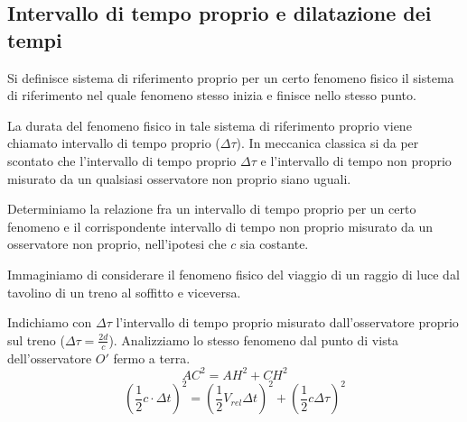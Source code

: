     \subsection{Intervallo di tempo proprio e dilatazione dei tempi}
        \par Si definisce sistema di riferimento proprio per un certo fenomeno fisico il sistema di riferimento nel quale fenomeno stesso inizia e finisce nello stesso punto.
        \par La durata del fenomeno fisico in tale sistema di riferimento proprio viene chiamato intervallo di tempo proprio ($\Delta\tau$). In meccanica classica si da per scontato che l'intervallo di tempo proprio $\Delta\tau$ e l'intervallo di tempo non proprio misurato da un qualsiasi osservatore non proprio siano uguali.
        \par Determiniamo la relazione fra un intervallo di tempo proprio per un certo fenomeno e il corrispondente intervallo di tempo non proprio misurato da un osservatore non proprio, nell'ipotesi che $c$ sia costante.
        \par Immaginiamo di considerare il fenomeno fisico del viaggio di un raggio di luce dal tavolino di un treno al soffitto e viceversa.
        \par Indichiamo con $\Delta\tau$ l'intervallo di tempo proprio misurato dall'osservatore proprio sul treno ($\Delta\tau=\frac{2d}{c}$). Analizziamo lo stesso fenomeno dal punto di vista dell'osservatore $O'$ fermo a terra.
        \begin{equation*}
            AC^2=AH^2+CH^2
        \end{equation*}
        \begin{equation*}
            (\frac{1}{2}c\cdot\Delta t)^2 = (\frac{1}{2}V_{rel}\Delta t)^2 + (\frac{1}{2}c\Delta\tau)^2
        \end{equation*}
